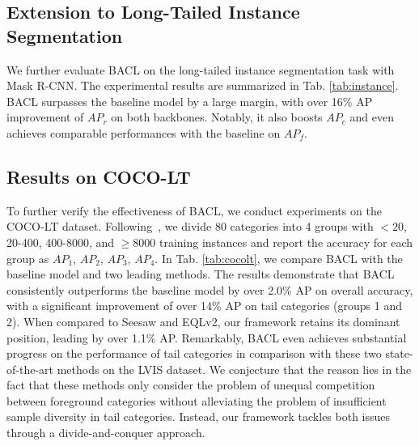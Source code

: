\documentclass[lettersize,journal]{IEEEtran}
\begin{document}
\subsection{Extension to Long-Tailed Instance Segmentation}
We further evaluate BACL on the long-tailed instance segmentation task with Mask R-CNN.
The experimental results are summarized in Tab. \ref{tab:instance}.
BACL surpasses the baseline model by a large margin, with over 16\% AP improvement of $AP_r$ on both backbones.
Notably, it also boosts $AP_c$ and even achieves comparable performances with the baseline on $AP_f$.

\subsection{Results on COCO-LT}
To further verify the effectiveness of BACL, we conduct experiments on the COCO-LT dataset.
Following~\cite{wang2020devil}, we divide 80 categories into 4 groups with $<20$, 20-400, 400-8000, and $\ge 8000$ training instances and report the accuracy for each group as $AP_1$, $AP_2$, $AP_3$, $AP_4$.
In Tab. \ref{tab:cocolt}, we compare BACL with the baseline model and two leading methods.
The results demonstrate that BACL consistently outperforms the baseline model by over 2.0\% AP on overall accuracy, with a significant improvement of over 14\% AP on tail categories (groups 1 and 2).
When compared to Seesaw and EQLv2, our framework retains its dominant position, leading by over 1.1\% AP.
Remarkably, BACL even achieves substantial progress on the performance of tail categories in comparison with these two state-of-the-art methods on the LVIS dataset.
We conjecture that the reason lies in the fact that these methods only consider the problem of unequal competition between foreground categories without alleviating the problem of insufficient sample diversity in tail categories.
Instead, our framework tackles both issues through a divide-and-conquer approach.
 
\end{document}
